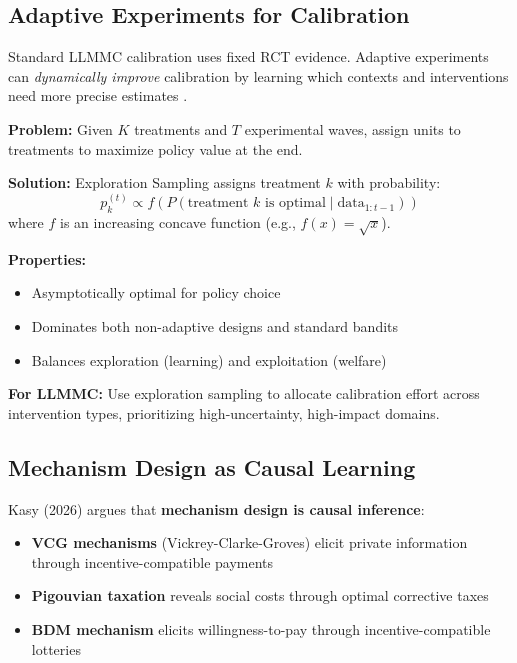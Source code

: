 \subsection{Adaptive Experiments for Calibration}

Standard LLMMC calibration uses fixed RCT evidence. Adaptive experiments can
\emph{dynamically improve} calibration by learning which contexts and interventions
need more precise estimates \citep{kasy2021adaptive}.

\begin{tcolorbox}[colback=green!5!white, colframe=green!75!black,
    title=Exploration Sampling Algorithm (Kasy \& Sautmann 2021)]

\textbf{Problem:} Given $K$ treatments and $T$ experimental waves, assign units
to treatments to maximize policy value at the end.

\textbf{Solution:} Exploration Sampling assigns treatment $k$ with probability:
\[
p_k^{(t)} \propto f\left( P(\text{treatment } k \text{ is optimal} \mid \text{data}_{1:t-1}) \right)
\]
where $f$ is an increasing concave function (e.g., $f(x) = \sqrt{x}$).

\textbf{Properties:}
\begin{itemize}[nosep]
\item Asymptotically optimal for policy choice
\item Dominates both non-adaptive designs and standard bandits
\item Balances exploration (learning) and exploitation (welfare)
\end{itemize}

\textbf{For LLMMC:} Use exploration sampling to allocate calibration effort
across intervention types, prioritizing high-uncertainty, high-impact domains.
\end{tcolorbox}

\subsection{Mechanism Design as Causal Learning}

Kasy (2026) argues that \textbf{mechanism design is causal inference}:

\begin{itemize}
\item \textbf{VCG mechanisms} (Vickrey-Clarke-Groves) elicit private information
through incentive-compatible payments \citep{vickrey1961counterspeculation, clarke1971multipart, groves1973incentives}

\item \textbf{Pigouvian taxation} reveals social costs through optimal corrective
taxes \citep{pigou1920welfare}

\item \textbf{BDM mechanism} elicits willingness-to-pay through incentive-compatible
lotteries \citep{becker1964bdm}
\end{itemize}

